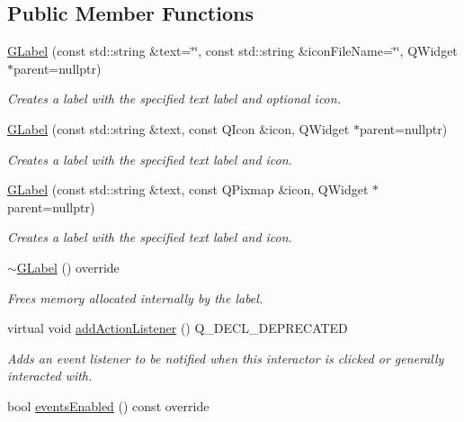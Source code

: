 \subsection*{Public Member Functions}
\begin{DoxyCompactItemize}
\item 
\mbox{\hyperlink{classsgl_1_1GLabel_adf89e6364d00b440441edce14145b387}{G\+Label}} (const std\+::string \&text=\char`\"{}\char`\"{}, const std\+::string \&icon\+File\+Name=\char`\"{}\char`\"{}, Q\+Widget $\ast$parent=nullptr)
\begin{DoxyCompactList}\small\item\em Creates a label with the specified text label and optional icon. \end{DoxyCompactList}\item 
\mbox{\hyperlink{classsgl_1_1GLabel_a66c34c2b874bdb9dc0561b87ac2fccdd}{G\+Label}} (const std\+::string \&text, const Q\+Icon \&icon, Q\+Widget $\ast$parent=nullptr)
\begin{DoxyCompactList}\small\item\em Creates a label with the specified text label and icon. \end{DoxyCompactList}\item 
\mbox{\hyperlink{classsgl_1_1GLabel_ad3979ef59a046161fc57992d97bebe54}{G\+Label}} (const std\+::string \&text, const Q\+Pixmap \&icon, Q\+Widget $\ast$parent=nullptr)
\begin{DoxyCompactList}\small\item\em Creates a label with the specified text label and icon. \end{DoxyCompactList}\item 
\mbox{\hyperlink{classsgl_1_1GLabel_a1d11ab4dd459b9a9b1f28410344cfc33}{$\sim$\+G\+Label}} () override
\begin{DoxyCompactList}\small\item\em Frees memory allocated internally by the label. \end{DoxyCompactList}\item 
virtual void \mbox{\hyperlink{classsgl_1_1GInteractor_a02f20ea6edfa0671f31c4c648a253833}{add\+Action\+Listener}} () Q\+\_\+\+D\+E\+C\+L\+\_\+\+D\+E\+P\+R\+E\+C\+A\+T\+ED
\begin{DoxyCompactList}\small\item\em Adds an event listener to be notified when this interactor is clicked or generally interacted with. \end{DoxyCompactList}\item 
bool \mbox{\hyperlink{classsgl_1_1GInteractor_a597a370b592e3737d38d9d2f4e2031ea}{events\+Enabled}} () const override

\end{DoxyCompactItemize}
